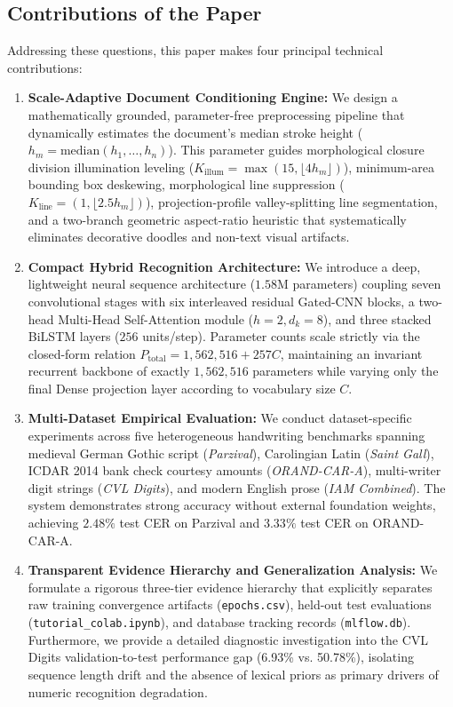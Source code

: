 \documentclass{IEEEtran}
\begin{document}
\subsection{Contributions of the Paper}

Addressing these questions, this paper makes four principal technical contributions:

\begin{enumerate}

    \item \textbf{Scale-Adaptive Document Conditioning Engine:} We design a mathematically grounded, parameter-free preprocessing pipeline that dynamically estimates the document's median stroke height ($h_m = \text{median}(h_1, \ldots, h_n)$). This parameter guides morphological closure division illumination leveling ($K_{\text{illum}} = \max(15, \lfloor 4h_m \rfloor)$), minimum-area bounding box deskewing, morphological line suppression ($K_{\text{line}} = (1, \lfloor 2.5h_m \rfloor)$), projection-profile valley-splitting line segmentation, and a two-branch geometric aspect-ratio heuristic that systematically eliminates decorative doodles and non-text visual artifacts.

    \item \textbf{Compact Hybrid Recognition Architecture:} We introduce a deep, lightweight neural sequence architecture ($1.58\text{M}$ parameters) coupling seven convolutional stages with six interleaved residual Gated-CNN blocks, a two-head Multi-Head Self-Attention module ($h=2, d_k=8$), and three stacked BiLSTM layers ($256$ units/step). Parameter counts scale strictly via the closed-form relation $P_{\text{total}} = 1,562,516 + 257C$, maintaining an invariant recurrent backbone of exactly $1,562,516$ parameters while varying only the final Dense projection layer according to vocabulary size $C$.

    \item \textbf{Multi-Dataset Empirical Evaluation:} We conduct dataset-specific experiments across five heterogeneous handwriting benchmarks spanning medieval German Gothic script (\emph{Parzival}), Carolingian Latin (\emph{Saint Gall}), ICDAR 2014 bank check courtesy amounts (\emph{ORAND-CAR-A}), multi-writer digit strings (\emph{CVL Digits}), and modern English prose (\emph{IAM Combined}). The system demonstrates strong accuracy without external foundation weights, achieving $2.48\%$ test CER on Parzival and $3.33\%$ test CER on ORAND-CAR-A.

    \item \textbf{Transparent Evidence Hierarchy and Generalization Analysis:} We formulate a rigorous three-tier evidence hierarchy that explicitly separates raw training convergence artifacts (\texttt{epochs.csv}), held-out test evaluations (\texttt{tutorial\_colab.ipynb}), and database tracking records (\texttt{mlflow.db}). Furthermore, we provide a detailed diagnostic investigation into the CVL Digits validation-to-test performance gap (6.93\% vs. 50.78\%), isolating sequence length drift and the absence of lexical priors as primary drivers of numeric recognition degradation.

\end{enumerate}
\end{document}
